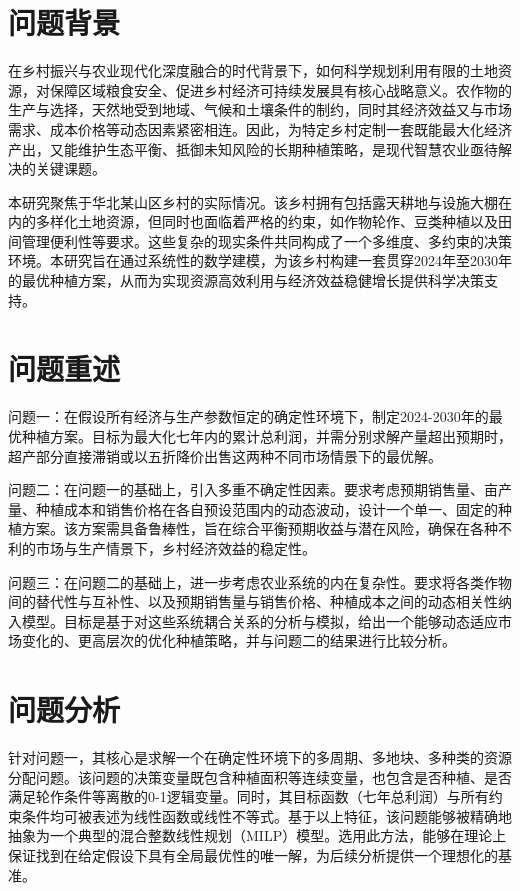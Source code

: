 \documentclass[withoutpreface,bwprint]{cumcmthesis} %
\begin{document}




\section{问题背景}

在乡村振兴与农业现代化深度融合的时代背景下，如何科学规划利用有限的土地资源，对保障区域粮食安全、促进乡村经济可持续发展具有核心战略意义。农作物的生产与选择，天然地受到地域、气候和土壤条件的制约，同时其经济效益又与市场需求、成本价格等动态因素紧密相连。因此，为特定乡村定制一套既能最大化经济产出，又能维护生态平衡、抵御未知风险的长期种植策略，是现代智慧农业亟待解决的关键课题。

本研究聚焦于华北某山区乡村的实际情况。该乡村拥有包括露天耕地与设施大棚在内的多样化土地资源，但同时也面临着严格的约束，如作物轮作、豆类种植以及田间管理便利性等要求。这些复杂的现实条件共同构成了一个多维度、多约束的决策环境。本研究旨在通过系统性的数学建模，为该乡村构建一套贯穿2024年至2030年的最优种植方案，从而为实现资源高效利用与经济效益稳健增长提供科学决策支持。

\section{问题重述}

问题一：在假设所有经济与生产参数恒定的确定性环境下，制定2024-2030年的最优种植方案。目标为最大化七年内的累计总利润，并需分别求解产量超出预期时，超产部分直接滞销或以五折降价出售这两种不同市场情景下的最优解。

问题二：在问题一的基础上，引入多重不确定性因素。要求考虑预期销售量、亩产量、种植成本和销售价格在各自预设范围内的动态波动，设计一个单一、固定的种植方案。该方案需具备鲁棒性，旨在综合平衡预期收益与潜在风险，确保在各种不利的市场与生产情景下，乡村经济效益的稳定性。

问题三：在问题二的基础上，进一步考虑农业系统的内在复杂性。要求将各类作物间的替代性与互补性、以及预期销售量与销售价格、种植成本之间的动态相关性纳入模型。目标是基于对这些系统耦合关系的分析与模拟，给出一个能够动态适应市场变化的、更高层次的优化种植策略，并与问题二的结果进行比较分析。


\section{问题分析}


针对问题一，其核心是求解一个在确定性环境下的多周期、多地块、多种类的资源分配问题。该问题的决策变量既包含种植面积等连续变量，也包含是否种植、是否满足轮作条件等离散的0-1逻辑变量。同时，其目标函数（七年总利润）与所有约束条件均可被表述为线性函数或线性不等式。基于以上特征，该问题能够被精确地抽象为一个典型的混合整数线性规划（MILP）模型。选用此方法，能够在理论上保证找到在给定假设下具有全局最优性的唯一解，为后续分析提供一个理想化的基准。
\end{document}
